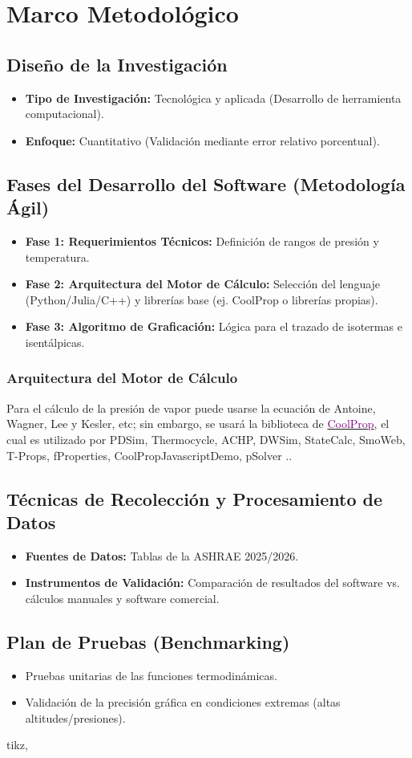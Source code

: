 \section{Marco Metodológico}
\label{sec:marco_metodologico}


\subsection{Diseño de la Investigación}
\begin{itemize}
    \item \textbf{Tipo de Investigación:} Tecnológica y aplicada (Desarrollo de herramienta computacional).
    \item \textbf{Enfoque:} Cuantitativo (Validación mediante error relativo porcentual).
\end{itemize}

\subsection{Fases del Desarrollo del Software (Metodología Ágil)}
\begin{itemize}
    \item \textbf{Fase 1: Requerimientos Técnicos:} Definición de rangos de presión y temperatura.
    \item \textbf{Fase 2: Arquitectura del Motor de Cálculo:} Selección del lenguaje (Python/Julia/C++) y librerías base (ej. CoolProp o librerías propias).
    \item \textbf{Fase 3: Algoritmo de Graficación:} Lógica para el trazado de isotermas e isentálpicas.
\end{itemize}

\subsubsection{Arquitectura del Motor de Cálculo}
    Para el cálculo de la presión de vapor puede usarse la ecuación de Antoine, Wagner, Lee y Kesler, etc; sin embargo, se usará la biblioteca de \href{https://coolprop.org}{\textcolor{purple}{CoolProp}}, el cual es utilizado por PDSim, Thermocycle, ACHP, DWSim, StateCalc, SmoWeb, T-Props, fProperties, CoolPropJavascriptDemo, pSolver \parencite{bib:CoolProp:doi:10.1021/ie4033999}..

\subsection{Técnicas de Recolección y Procesamiento de Datos}
\begin{itemize}
    \item \textbf{Fuentes de Datos:} Tablas de la ASHRAE 2025/2026.
    \item \textbf{Instrumentos de Validación:} Comparación de resultados del software vs. cálculos manuales y software comercial.
\end{itemize}

\subsection{Plan de Pruebas (Benchmarking)}
\begin{itemize}
    \item Pruebas unitarias de las funciones termodinámicas.
    \item Validación de la precisión gráfica en condiciones extremas (altas altitudes/presiones).
\end{itemize}

tikz, 